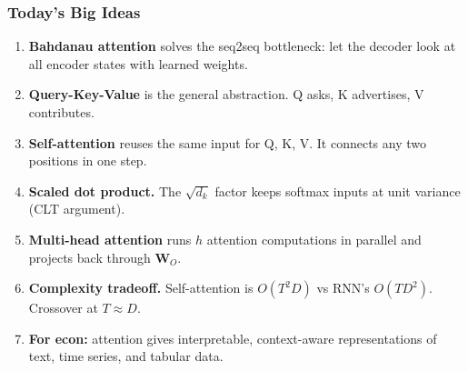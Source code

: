 \documentclass[notes,11pt, aspectratio=169]{beamer}
\newcommand{\vW}{\mathbf{W}}
\begin{document}
\begin{frame}
\frametitle{Today's Big Ideas}

\begin{enumerate}
    \item \textbf{Bahdanau attention} solves the seq2seq bottleneck: let the decoder look at all encoder states with learned weights.

    \vspace{4pt}
    \item \textbf{Query-Key-Value} is the general abstraction. Q asks, K advertises, V contributes.

    \vspace{4pt}
    \item \textbf{Self-attention} reuses the same input for Q, K, V. It connects any two positions in one step.

    \vspace{4pt}
    \item \textbf{Scaled dot product.} The $\sqrt{d_k}$ factor keeps softmax inputs at unit variance (CLT argument).

    \vspace{4pt}
    \item \textbf{Multi-head attention} runs $h$ attention computations in parallel and projects back through $\vW_O$.

    \vspace{4pt}
    \item \textbf{Complexity tradeoff.} Self-attention is $O(T^2 D)$ vs RNN's $O(T D^2)$. Crossover at $T \approx D$.

    \vspace{4pt}
    \item \textbf{For econ:} attention gives interpretable, context-aware representations of text, time series, and tabular data.
\end{enumerate}
\end{frame}
\end{document}
